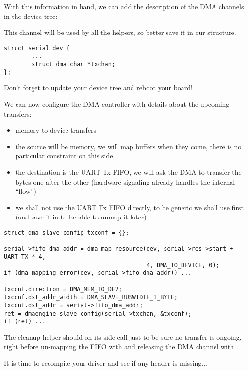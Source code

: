 With this information in hand, we can add the description of the DMA channels in
the device tree:


This channel will be used by all the  helpers, so better
save it in our  structure.
\begin{verbatim}
struct serial_dev {
        ...
        struct dma_chan *txchan;
};
\end{verbatim}

Don't forget to update your device tree and reboot your board!

We can now configure the DMA controller with details about the upcoming
transfers:
\begin{itemize}
\item memory to device transfers
\item the source will be memory, we will map buffers when they come,
  there is no particular constraint on this side
\item the destination is the UART Tx FIFO, we will ask the DMA to
  transfer the bytes one after the other (hardware signaling already
  handles the internal ``flow'')
\item we shall not use the UART Tx FIFO directly, to be generic we shall use
   first (and save it in  to be able
  to unmap it later)
\end{itemize}

\begin{verbatim}
struct dma_slave_config txconf = {};

serial->fifo_dma_addr = dma_map_resource(dev, serial->res->start + UART_TX * 4,
                                         4, DMA_TO_DEVICE, 0);
if (dma_mapping_error(dev, serial->fifo_dma_addr)) ...

txconf.direction = DMA_MEM_TO_DEV;
txconf.dst_addr_width = DMA_SLAVE_BUSWIDTH_1_BYTE;
txconf.dst_addr = serial->fifo_dma_addr;
ret = dmaengine_slave_config(serial->txchan, &txconf);
if (ret) ...
\end{verbatim}

The cleanup helper should on its side call
 just to be sure no transfer is
ongoing, right before un-mapping the FIFO with  and
releasing the DMA channel with .

It is time to recompile your driver and see if any header is missing...

